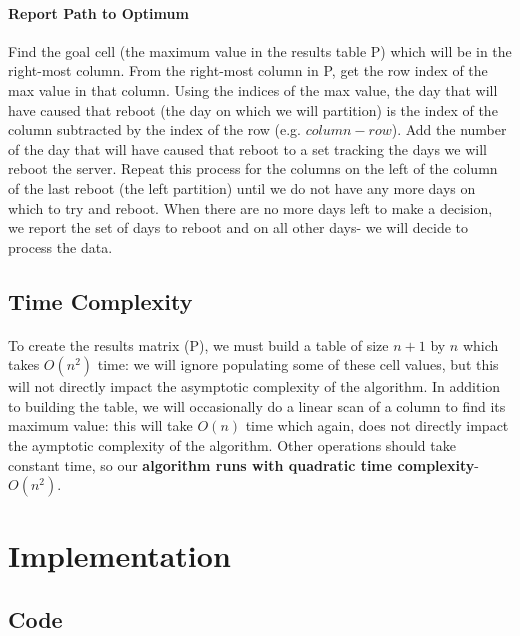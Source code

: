 \documentclass[12pt]{article}
\begin{document}
\paragraph{Report Path to Optimum}
Find the goal cell (the maximum value in the results table P) which will be in the right-most column.
From the right-most column in P, get the row index of the max value in that column.
Using the indices of the max value, the day that will have caused that reboot (the day on which we will partition) is the index of the column subtracted by the index of the row (e.g. $column - row$).
Add the number of the day that will have caused that reboot to a set tracking the days we will reboot the server.
Repeat this process for the columns on the left of the column of the last reboot (the left partition) until we do not have any more days on which to try and reboot.
When there are no more days left to make a decision, we report the set of days to reboot and on all other days- we will decide to process the data.
\subsection{Time Complexity}
\paragraph{}
To create the results matrix (P), we must build a table of size $n + 1$ by $n$ which takes $O(n^2)$ time: we will ignore populating some of these cell values, but this will not directly impact the asymptotic complexity of the algorithm.
In addition to building the table, we will occasionally do a linear scan of a column to find its maximum value: this will take $O(n)$ time which again, does not directly impact the aymptotic complexity of the algorithm. Other operations should take constant time, so our \textbf{algorithm runs with quadratic time complexity}- $O(n^2)$.
\section{Implementation}
\subsection{Code}
\lstset{tabsize=2,
	numbers=left, numberstyle=\tiny,
	frame=single,
	language=Ruby,
	breaklines=true, breakindent=5pt,
	extendedchars=true
}

\end{document}
